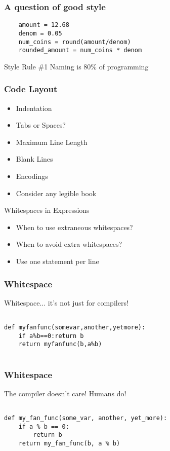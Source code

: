 \documentclass[compress,14pt]{beamer}
\begin{document}
\begin{frame}[fragile] \frametitle{A question of good style}
  \begin{lstlisting}
    amount = 12.68
    denom = 0.05
    num_coins = round(amount/denom)
    rounded_amount = num_coins * denom
  \end{lstlisting}
  \pause
  \begin{block}{Style Rule \#1}
    Naming is 80\% of programming
  \end{block}
\end{frame}

\begin{frame}[fragile]
  \frametitle{Code Layout}
  \begin{itemize}
        \item Indentation
        \item Tabs or Spaces?
        \item Maximum Line Length
        \item Blank Lines
        \item Encodings
        \item Consider any legible book
   \end{itemize}
\end{frame}

\begin{frame}{Whitespaces in Expressions}
  \begin{itemize}
        \item When to use extraneous whitespaces?
        \item When to avoid extra whitespaces?
        \item Use one statement per line
   \end{itemize}
\end{frame}

\begin{frame}[fragile]
 \frametitle{Whitespace}
 Whitespace... it's not just for compilers!
  \begin{lstlisting}

def myfanfunc(somevar,another,yetmore):
    if a%b==0:return b
    return myfanfunc(b,a%b)
      
  \end{lstlisting}
\end{frame}

\begin{frame}[fragile]
 \frametitle{Whitespace}
 The compiler doesn't care!  Humans do!
  \begin{lstlisting}

def my_fan_func(some_var, another, yet_more):
    if a % b == 0:
        return b
    return my_fan_func(b, a % b)
      
  \end{lstlisting}
\end{frame}
\end{document}
